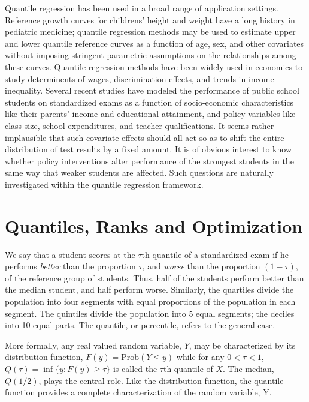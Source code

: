 \documentclass{amsart}
\begin{document}
Quantile regression has been used in a broad range of application settings.
Reference growth curves for childrens' height and weight have a long history
in pediatric medicine; quantile regression methods may be used to estimate
upper and lower quantile reference curves as a function of age, sex, and
other covariates without imposing stringent parametric assumptions on the
relationships among these curves.  Quantile regression methods have been
widely used in economics to study determinents of wages, discrimination
effects, and trends in income inequality.  
Several recent studies have modeled the performance of public school
students on standardized exams as a function of socio-economic characteristics
like their parents' income and educational attainment, and policy variables 
like class size, school expenditures, and teacher qualifications.  It seems
rather implausible that such covariate effects should all act so as to
shift the entire distribution of test results by a fixed amount.
It is of obvious interest to know whether policy interventions alter
performance of the strongest students in the same way that weaker students
are affected.  Such questions are naturally investigated within the quantile
regression framework.  

 
\section{Quantiles, Ranks and Optimization}

We say that a student scores at the $\tau$th quantile
of a standardized exam if he performs {\it better} than the proportion $\tau$, 
and {\it worse} than the proportion $(1-\tau)$, 
of the reference group of students.
Thus, half of the students perform better than the median student, and half
perform worse.  Similarly, the quartiles divide the population into four 
segments with equal proportions of the population in each segment.  
The quintiles divide the population into 5 equal segments; the deciles
into 10 equal parts.  The quantile, or percentile, refers to the general case.

More formally, any real valued random variable, $Y$, 
may be characterized by its distribution function,
 $
F(y) = \mathrm{Prob}(Y  \leq  y)
$ 
while for any $0 < \tau < 1$, 
 $
Q ( \tau )  = \inf \{ y : F(y) \geq \tau \}
$ 
is called the $\tau$th quantile of $X$.
The median, $Q( 1/2 )$,  plays the central role.
Like the distribution function, the quantile function provides a
complete characterization of the random variable, Y.
\end{document}
